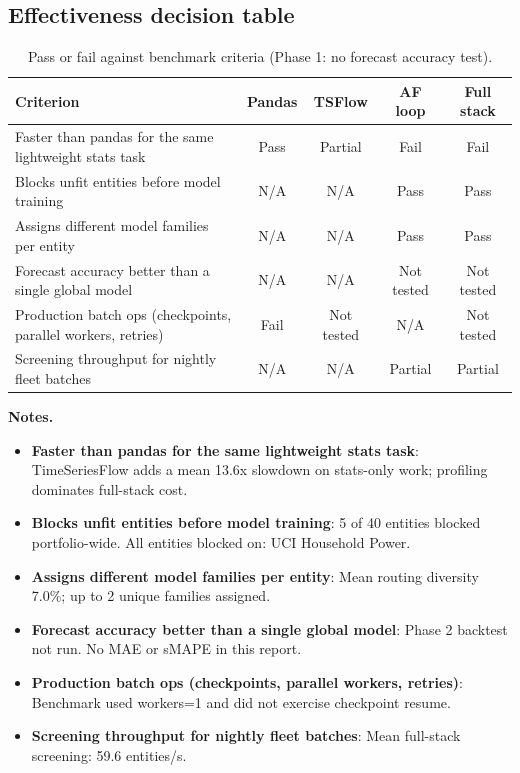 \documentclass[11pt,a4paper]{article}
\begin{document}
\subsection{Effectiveness decision table}
\begin{table}[htbp]
\centering
\caption{Pass or fail against benchmark criteria (Phase 1: no forecast accuracy test).}
\label{tab:decision}
\small
\begin{tabular}{p{4.8cm}cccc}
\toprule
Criterion & Pandas & TSFlow & AF loop & Full stack \\
\midrule
Faster than pandas for the same lightweight stats task & Pass & Partial & Fail & Fail \\
Blocks unfit entities before model training & N/A & N/A & Pass & Pass \\
Assigns different model families per entity & N/A & N/A & Pass & Pass \\
Forecast accuracy better than a single global model & N/A & N/A & Not tested & Not tested \\
Production batch ops (checkpoints, parallel workers, retries) & Fail & Not tested & N/A & Not tested \\
Screening throughput for nightly fleet batches & N/A & N/A & Partial & Partial \\
\bottomrule
\end{tabular}
\end{table}

\noindent\textbf{Notes.}
\begin{itemize}
  \item \textbf{Faster than pandas for the same lightweight stats task}: TimeSeriesFlow adds a mean 13.6x slowdown on stats-only work; profiling dominates full-stack cost.
  \item \textbf{Blocks unfit entities before model training}: 5 of 40 entities blocked portfolio-wide. All entities blocked on: UCI Household Power.
  \item \textbf{Assigns different model families per entity}: Mean routing diversity 7.0\%; up to 2 unique families assigned.
  \item \textbf{Forecast accuracy better than a single global model}: Phase 2 backtest not run. No MAE or sMAPE in this report.
  \item \textbf{Production batch ops (checkpoints, parallel workers, retries)}: Benchmark used workers=1 and did not exercise checkpoint resume.
  \item \textbf{Screening throughput for nightly fleet batches}: Mean full-stack screening: 59.6 entities/s.
\end{itemize}
\end{document}
